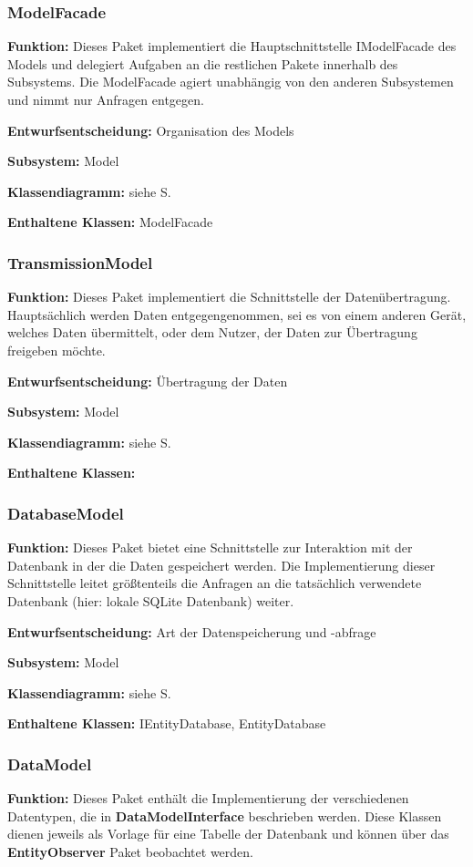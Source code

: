 \documentclass[a4paper]{scrreprt}
\begin{document}
\subsubsection{ModelFacade}
\textbf{Funktion:} Dieses Paket implementiert die Hauptschnittstelle IModelFacade des Models und delegiert Aufgaben an die restlichen Pakete innerhalb des Subsystems.
Die ModelFacade agiert unabhängig von den anderen Subsystemen und nimmt nur Anfragen entgegen.

\textbf{Entwurfsentscheidung:} Organisation des Models

\textbf{Subsystem:} Model

\textbf{Klassendiagramm:} siehe S.

\textbf{Enthaltene Klassen:} ModelFacade

\subsubsection{TransmissionModel}
\textbf{Funktion:} Dieses Paket implementiert die Schnittstelle der Datenübertragung. Hauptsächlich werden Daten entgegengenommen, sei es von einem anderen Gerät, welches Daten übermittelt, oder dem Nutzer, der Daten zur Übertragung freigeben möchte. 

\textbf{Entwurfsentscheidung:} Übertragung der Daten

\textbf{Subsystem:} Model

\textbf{Klassendiagramm:} siehe S.

\textbf{Enthaltene Klassen:} 

\subsubsection{DatabaseModel}
\textbf{Funktion:} Dieses Paket bietet eine Schnittstelle zur Interaktion mit der Datenbank in der die Daten gespeichert werden. 
Die Implementierung dieser Schnittstelle leitet größtenteils die Anfragen an die tatsächlich verwendete Datenbank (hier: lokale SQLite Datenbank) weiter.

\textbf{Entwurfsentscheidung:} Art der Datenspeicherung und -abfrage 

\textbf{Subsystem:} Model

\textbf{Klassendiagramm:} siehe S.

\textbf{Enthaltene Klassen:} IEntityDatabase, EntityDatabase

\subsubsection{DataModel}
\textbf{Funktion:} Dieses Paket enthält die Implementierung der verschiedenen Datentypen, die in \textbf{DataModelInterface} beschrieben werden. 
Diese Klassen dienen jeweils als Vorlage für eine Tabelle der Datenbank und können über das \textbf{EntityObserver} Paket beobachtet werden.
\end{document}
